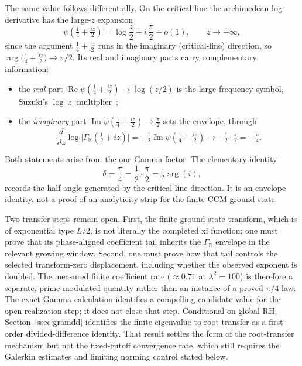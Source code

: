 \documentclass[11pt,a4paper]{article}
\begin{document}
The same value follows differentially. On the critical line the archimedean
log-derivative has the large-$z$ expansion
\begin{equation}\label{eq:digamma-split}
  \psi\!\left(\tfrac14+\tfrac{iz}{2}\right)=\log\frac{z}{2}
  +i\,\frac{\pi}{2}+o(1),\qquad z\to+\infty,
\end{equation}
since the argument $\tfrac14+\tfrac{iz}{2}$ runs in the imaginary
(critical-line) direction, so $\arg\bigl(\tfrac14+\tfrac{iz}{2}\bigr)\to\pi/2$.
Its real and imaginary parts carry complementary information:
\begin{itemize}
\item the \emph{real} part $\operatorname{Re}\psi(\tfrac14+\tfrac{iz}{2})\to
  \log(z/2)$ is the large-frequency symbol, Suzuki's $\log|z|$
  multiplier~\cite{Suzuki2026};
\item the \emph{imaginary} part $\operatorname{Im}\psi(\tfrac14+\tfrac{iz}{2})\to
  \tfrac{\pi}{2}$ sets the envelope, through
  \[
    \frac{d}{dz}\log\bigl|\Gamma_\mathbb{R}(\tfrac12+iz)\bigr|
    =-\tfrac12\operatorname{Im}\psi\!\left(\tfrac14+\tfrac{iz}{2}\right)
    \longrightarrow-\tfrac12\cdot\tfrac{\pi}{2}=-\tfrac{\pi}{4}.
  \]
\end{itemize}
Both statements arise from the one Gamma factor. The elementary identity
\begin{equation}\label{eq:pi4}
  \delta=\frac{\pi}{4}=\frac12\cdot\frac{\pi}{2}=\tfrac12\arg(i),
\end{equation}
records the half-angle generated by the critical-line direction. It is an
envelope identity, not a proof of an analyticity strip for the finite CCM
ground state.

Two transfer steps remain open. First, the finite ground-state transform, which
is of exponential type $L/2$, is not literally the completed xi function; one
must prove that its phase-aligned coefficient tail inherits the
$\Gamma_\mathbb{R}$ envelope in the relevant growing window. Second, one must
prove how that tail controls the selected transform-zero displacement, including
whether the observed exponent is doubled. The measured finite coefficient rate
($\approx0.71$ at $\lambda^2=100$) is therefore a separate, prime-modulated
quantity rather than an instance of a proved $\pi/4$ law. The exact Gamma
calculation identifies a compelling candidate value for the open realization
step; it does not close that step. Conditional on global RH,
Section~\ref{ssec:gramdd} identifies the finite eigenvalue-to-root transfer as
a first-order divided-difference identity. That result settles the form of the
root-transfer mechanism but not the fixed-cutoff convergence rate, which still
requires the Galerkin estimates and limiting norming control stated below.
\end{document}
